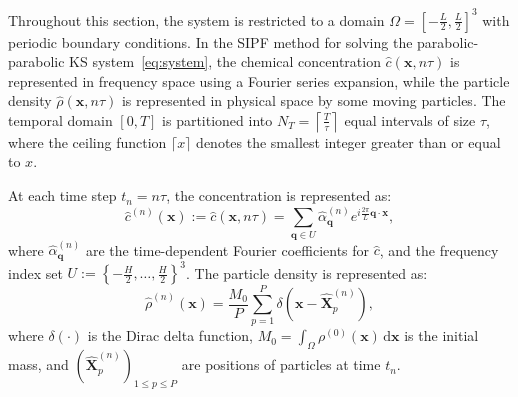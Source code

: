 \documentclass[review,onefignum,onetabnum]{siamart250211}
\begin{document}
Throughout this section, the system is restricted to a domain \( \Omega = \left[-\frac{L}{2}, \frac{L}{2}\right]^3 \) with periodic boundary conditions. In the SIPF method for solving the parabolic-parabolic KS system~\eqref{eq:system}, the chemical concentration \(\hat{c}(\mathbf{x}, n\tau) \) is represented in frequency space using a Fourier series expansion, while the particle density \( \hat{\rho}(\mathbf{x}, n\tau) \) is represented in physical space by some moving particles. The temporal domain \([0, T]\) is partitioned into $N_T = \left\lceil \frac{T}{\tau} \right\rceil$ equal intervals of size \( \tau \), where the ceiling function $\lceil x \rceil$ denotes the smallest integer greater than or equal to $x$.

At each time step \(t_n = n\tau \), the concentration is represented as:
\begin{equation}
\label{eq:U}
\hat{c}^{(n)}(\mathbf{x}):=\hat{c}(\mathbf{x}, n\tau) = \sum_{\mathbf{q} \in U} \hat{\alpha}_{\mathbf{q}}^{(n)} e^{i \frac{2\pi}{L} \mathbf{q} \cdot \mathbf{x}},
\end{equation}
where \( \hat{\alpha}_{\mathbf{q}}^{(n)} \) are the time-dependent Fourier coefficients for \(\hat{c}\), and the frequency index set \(U := \left\{-\frac{H}{2}, \ldots, \frac{H}{2}\right\}^3\). The particle density is represented as:
\begin{equation}
\label{eq:def_rho_hat}
    \hat{\rho}^{(n)}(\mathbf{x}) = \frac{M_0}{P} \sum_{p=1}^P \delta\left(\mathbf{x} - \widehat{\mathbf{X}}_p^{(n)}\right),
\end{equation}
where \(\delta(\cdot)\) is the Dirac delta function, \(M_0 = \int_{\Omega} \rho^{(0)}(\mathbf{x})\,\mathrm{d}\mathbf{x}\) is the initial mass, and \((\widehat{\mathbf{X}}_p^{(n)})_{1\leq p \leq P}\) are positions of particles at time $t_n$.
\end{document}
